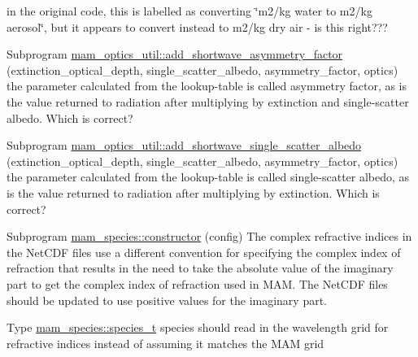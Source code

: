 \begin{DoxyRefList}
\label{todo__todo000009}%
%
in the original code, this is labelled as converting \char`\"{}m2/kg  water to m2/kg aerosol\char`\"{}, but it appears to convert instead to m2/kg dry air -\/ is this right???  
\item[Subprogram \mbox{\hyperlink{namespacemam__optics__util_a0149038eae747d9b5e3809633415bab6}{mam\+\_\+optics\+\_\+util\+::add\+\_\+shortwave\+\_\+asymmetry\+\_\+factor}} (extinction\+\_\+optical\+\_\+depth, single\+\_\+scatter\+\_\+albedo, asymmetry\+\_\+factor, optics)]\label{todo__todo000013}%
%
the parameter calculated from the lookup-\/table is called asymmetry factor, as is the value returned to radiation after multiplying by extinction and single-\/scatter albedo. Which is correct?  
\item[Subprogram \mbox{\hyperlink{namespacemam__optics__util_a8b91778ceede0fba8cfe3ee54c8e2a6c}{mam\+\_\+optics\+\_\+util\+::add\+\_\+shortwave\+\_\+single\+\_\+scatter\+\_\+albedo}} (extinction\+\_\+optical\+\_\+depth, single\+\_\+scatter\+\_\+albedo, asymmetry\+\_\+factor, optics)]\label{todo__todo000012}%
%
the parameter calculated from the lookup-\/table is called single-\/scatter albedo, as is the value returned to radiation after multiplying by extinction. Which is correct?  
\item[Subprogram \mbox{\hyperlink{namespacemam__species_a1155acd61c6fe7c1c3192dd41b618b53}{mam\+\_\+species\+::constructor}} (config)]\label{todo__todo000015}%
%
The complex refractive indices in the Net\+CDF files use a different convention for specifying the complex index of refraction that results in the need to take the absolute value of the imaginary part to get the complex index of refraction used in MAM. The Net\+CDF files should be updated to use positive values for the imaginary part.  
\item[Type \mbox{\hyperlink{structmam__species_1_1species__t}{mam\+\_\+species\+::species\+\_\+t}} ]\label{todo__todo000014}%
%
species should read in the wavelength grid for refractive indices instead of assuming it matches the MAM grid 
\end{DoxyRefList}